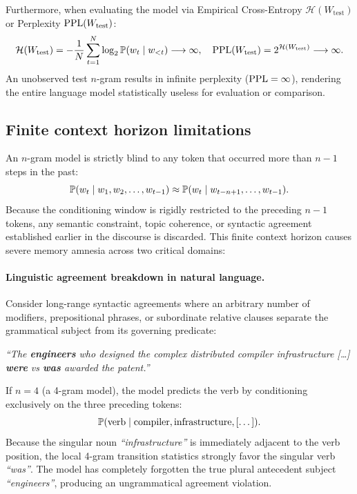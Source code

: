 \documentclass[../../main.tex]{subfiles}
\begin{document}
Furthermore, when evaluating the model via Empirical Cross-Entropy $\mathcal{H}(W_{\text{test}})$ or Perplexity $\mathrm{PPL}(W_{\text{test}})$:
\begin{equation}
\label{eq:ppl_zero_collapse}
\mathcal{H}(W_{\text{test}}) = -\frac{1}{N} \sum_{t=1}^N \log_2 \mathbb{P}(w_t \mid w_{<t}) \longrightarrow \infty, \quad \mathrm{PPL}(W_{\text{test}}) = 2^{\mathcal{H}(W_{\text{test}})} \longrightarrow \infty.
\end{equation}
An unobserved test $n$-gram results in infinite perplexity ($\mathrm{PPL} = \infty$), rendering the entire language model statistically useless for evaluation or comparison.

\subsection{Finite context horizon limitations}
An $n$-gram model is strictly blind to any token that occurred more than $n-1$ steps in the past:
\begin{equation}
\label{eq:context_truncation}
\mathbb{P}(w_t \mid w_1, w_2, \dots, w_{t-1}) \approx \mathbb{P}(w_t \mid w_{t-n+1}, \dots, w_{t-1}).
\end{equation}
Because the conditioning window is rigidly restricted to the preceding $n-1$ tokens, any semantic constraint, topic coherence, or syntactic agreement established earlier in the discourse is discarded. This finite context horizon causes severe memory amnesia across two critical domains:

\paragraph{Linguistic agreement breakdown in natural language.}
Consider long-range syntactic agreements where an arbitrary number of modifiers, prepositional phrases, or subordinate relative clauses separate the grammatical subject from its governing predicate:
\begin{center}
\textit{``The \textbf{engineers} who designed the complex distributed compiler infrastructure [\dots] \textbf{were} vs \textbf{was} awarded the patent.''}
\end{center}
If $n = 4$ (a 4-gram model), the model predicts the verb by conditioning exclusively on the three preceding tokens:
\[
\mathbb{P}(\text{verb} \mid \text{compiler}, \text{infrastructure}, [\dots]).
\]
Because the singular noun \textit{``infrastructure''} is immediately adjacent to the verb position, the local 4-gram transition statistics strongly favor the singular verb \textit{``was''}. The model has completely forgotten the true plural antecedent subject \textit{``engineers''}, producing an ungrammatical agreement violation.
\end{document}
